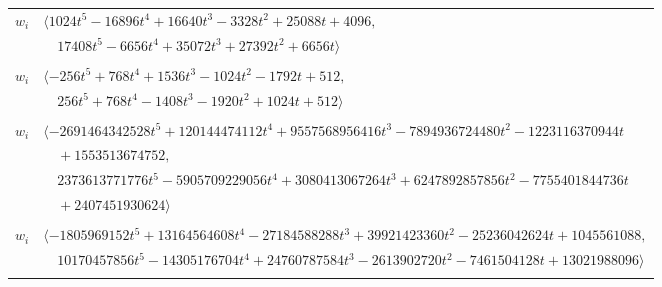 \documentclass[11pt]{article}
\begin{document}
\begin{longtable}{@{}ll@{}}
$w_i$ & $\langle 1024t^{5}-16896t^{4}+16640t^{3}-3328t^{2}+25088t+4096,$\\
 & $\quad 17408t^{5}-6656t^{4}+35072t^{3}+27392t^{2}+6656t\rangle$\\
\addlinespace[2pt]
\multicolumn{2}{@{}p{0.97\textwidth}@{}}{$i=47$, $D_i=16$, $e_i=3$, $\rho_{ij}$: $5{:}2, \allowbreak 6{:}1, \allowbreak 13{:}3, \allowbreak 16{:}3, \allowbreak 27{:}1, \allowbreak 28{:}1, \allowbreak 43{:}2, \allowbreak 60{:}2, \allowbreak 71{:}3$}\\
$w_i$ & $\langle -256t^{5}+768t^{4}+1536t^{3}-1024t^{2}-1792t+512,$\\
 & $\quad 256t^{5}+768t^{4}-1408t^{3}-1920t^{2}+1024t+512\rangle$\\
\addlinespace[2pt]
\multicolumn{2}{@{}p{0.97\textwidth}@{}}{$i=48$, $D_i=5940688$, $e_i=2$, $\rho_{ij}$: $2{:}2, \allowbreak 5{:}2, \allowbreak 7{:}3, \allowbreak 14{:}1, \allowbreak 15{:}1, \allowbreak 20{:}3, \allowbreak 22{:}1, \allowbreak 49{:}2, \allowbreak 52{:}3, \allowbreak 54{:}2, \allowbreak 57{:}3, \allowbreak 58{:}3, \allowbreak 71{:}1, \allowbreak 74{:}2$}\\
$w_i$ & $\langle -2691464342528t^{5}+120144474112t^{4}+9557568956416t^{3}-7894936724480t^{2}-1223116370944t$\\
 & $\quad +1553513674752,$\\
 & $\quad 2373613771776t^{5}-5905709229056t^{4}+3080413067264t^{3}+6247892857856t^{2}-7755401844736t$\\
 & $\quad +2407451930624\rangle$\\
\addlinespace[2pt]
\multicolumn{2}{@{}p{0.97\textwidth}@{}}{$i=49$, $D_i=1485172$, $e_i=0$, $\rho_{ij}$: $2{:}2, \allowbreak 3{:}3, \allowbreak 6{:}1, \allowbreak 11{:}3, \allowbreak 15{:}3, \allowbreak 16{:}3, \allowbreak 17{:}3, \allowbreak 21{:}2, \allowbreak 30{:}2, \allowbreak 42{:}1, \allowbreak 48{:}2, \allowbreak 54{:}2, \allowbreak 58{:}1, \allowbreak 62{:}1, \allowbreak 63{:}1, \allowbreak 64{:}1$}\\
$w_i$ & $\langle -1805969152t^{5}+13164564608t^{4}-27184588288t^{3}+39921423360t^{2}-25236042624t+1045561088,$\\
 & $\quad 10170457856t^{5}-14305176704t^{4}+24760787584t^{3}-2613902720t^{2}-7461504128t+13021988096\rangle$\\
\addlinespace[2pt]
\multicolumn{2}{@{}p{0.97\textwidth}@{}}{$i=50$, $D_i=500$, $e_i=3$, $\rho_{ij}$: $0{:}2, \allowbreak 2{:}3, \allowbreak 11{:}1, \allowbreak 15{:}2, \allowbreak 18{:}3, \allowbreak 35{:}1, \allowbreak 53{:}3, \allowbreak 57{:}3$}\\

\end{longtable}
\end{document}
